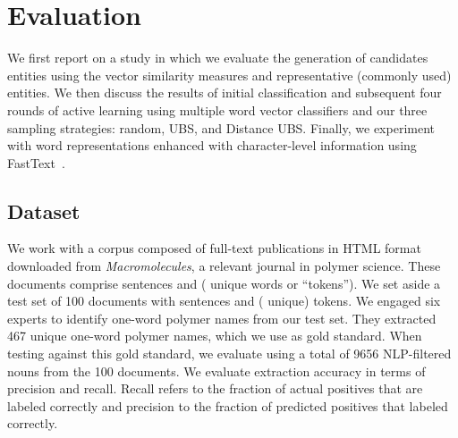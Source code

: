 \section{Evaluation}
\label{sect:apner_results}
We first report on a study in which we evaluate the generation of candidates entities using the vector similarity measures and representative (commonly used) entities. 
We then discuss the results of initial classification and subsequent four rounds of active learning using multiple word vector classifiers and our three sampling strategies: random, UBS, and Distance UBS.
Finally, we experiment with word representations enhanced with character-level information using FastText~\cite{bojanowski2016enriching,joulin2016bag}.

\subsection{Dataset}
We work with a corpus composed of  full-text publications in HTML format downloaded from \textit{Macromolecules}, a relevant journal in polymer science.
These documents comprise  sentences and  ( unique words or ``tokens'').
We set aside a test set of  100 documents with   sentences and  ( unique) tokens. 
We engaged six experts to identify one-word polymer names from our test set.
They extracted 467 unique one-word polymer names, which we use as gold standard.
When testing against this gold standard, we evaluate using a total of 9656 NLP-filtered nouns from the 100 documents.
We evaluate extraction accuracy in terms of precision and recall.
Recall refers to the fraction of actual positives that
are labeled correctly and precision to the fraction of predicted
positives that labeled correctly.

